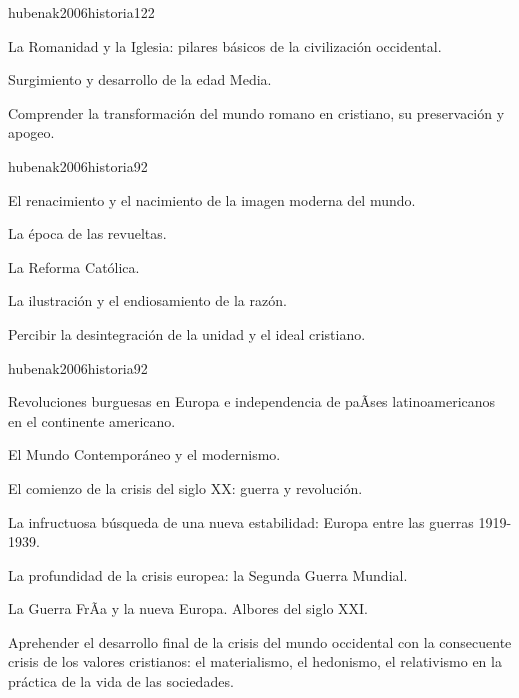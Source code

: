 \begin{syllabus}
\begin{unit}{}{hubenak2006historia}{12}{2}
\begin{topics}
	\item La Romanidad y la Iglesia: pilares básicos de la civilización occidental. 	
	\item Surgimiento y desarrollo de la edad Media.
\end{topics}
\begin{unitgoals}
	\item Comprender la transformación del mundo romano en cristiano, su preservación y apogeo.
\end{unitgoals}
\end{unit}

\begin{unit}{}{hubenak2006historia}{9}{2}
\begin{topics}
	\item El renacimiento y el nacimiento de la imagen moderna del mundo.  	
	\item La época de las revueltas. 	
	\item La Reforma Católica. 	
	\item La ilustración y el endiosamiento de la razón. 
\end{topics}
\begin{unitgoals}
	\item Percibir la desintegración de la unidad y el ideal cristiano.
\end{unitgoals}
\end{unit}

\begin{unit}{}{hubenak2006historia}{9}{2}
\begin{topics}
	\item Revoluciones burguesas en Europa e independencia de paÃ­ses latinoamericanos en el continente americano. 	
	\item El Mundo Contemporáneo y el modernismo. 	
	\item El comienzo de la crisis del siglo XX: guerra y revolución. 	
	\item La infructuosa búsqueda de una nueva estabilidad: Europa entre las guerras 1919-1939. 	
	\item La profundidad de la crisis europea: la Segunda Guerra Mundial. 	
	\item La Guerra FrÃ­a y la nueva Europa. Albores del siglo XXI.
\end{topics}
\begin{unitgoals}
	\item Aprehender el desarrollo final de la crisis del mundo occidental con la consecuente crisis de los valores cristianos: el materialismo, el hedonismo, el relativismo en la práctica de la vida de las sociedades. 
\end{unitgoals}
\end{unit}


\end{syllabus}

